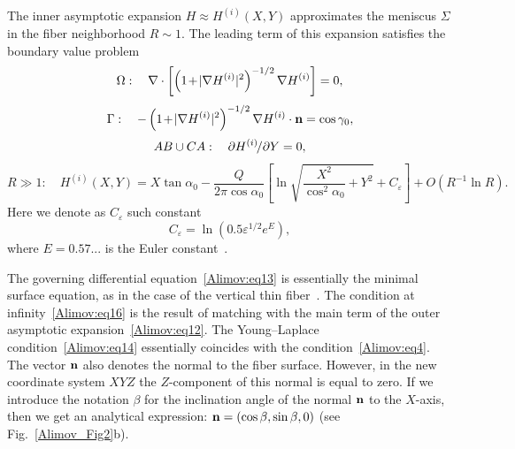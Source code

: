 \documentclass[
11pt,%
tightenlines,%
twoside,%
onecolumn,%
nofloats,%
nobibnotes,%
nofootinbib,%
superscriptaddress,%
noshowpacs,%
centertags]%
{revtex4-2}
\begin{document}
The inner asymptotic expansion $H \approx H^{(i)}(X,Y)$ approximates the meniscus $\Sigma $ in the
fiber neighborhood $R \sim 1$. The leading term of this expansion satisfies the boundary value
problem~\cite{Alimov:bib9}
\begin{equation}
\label{Alimov:eq13} \Omega :\quad \nabla \cdot \left[ {\left(
1\hspace{-0.5mm}+\hspace{-0.5mm}\vert\nabla H^{(i)}\vert^{2} \right)^{- 1/2}\nabla H^{(i)}} \right]
= 0,
\end{equation}
\begin{equation}
\label{Alimov:eq14} \Gamma :\quad -\left( 1\hspace{-0.5mm}+\hspace{-0.5mm}\vert\nabla
H^{(i)}\vert^{2} \right)^{-1/2}\nabla H^{(i)} \cdot {\rm {\bf n}} = \cos \gamma_0,
\end{equation}
\begin{equation}
\label{Alimov:eq15} AB \cup CA:\quad {\partial H^{(i)}}\hspace{-0.5mm}/{\partial Y} = 0,
\end{equation}
\begin{equation}
\label{Alimov:eq16} R \gg 1:\quad  H^{(i)}(X,Y) = X \tan \alpha_0 - \frac{Q}{2\pi \cos \alpha_0}
\left[ {\ln \sqrt {\frac{X^2}{\cos^2\alpha_0 } + Y^2}+C_\varepsilon } \right] + O\left( {R^{-1}\ln
R} \right).
\end{equation}
Here we denote as $C_\varepsilon$ such constant
\begin{equation}
\label{Alimov:eq17} C_\varepsilon = \ln \left( {0.5 \varepsilon^{1/2} e^E} \right),
\end{equation}
where $E = 0.57...$ is the Euler constant~\cite{Alimov:bib14}.

The governing differential equation~\eqref{Alimov:eq13} is essentially the minimal surface
equation, as in the case of the vertical thin fiber~\cite{Alimov:bib5}. The condition at
infinity~\eqref{Alimov:eq16} is the result of matching with the main term of the outer asymptotic
expansion~\eqref{Alimov:eq12}. The Young--Laplace condition~\eqref{Alimov:eq14} essentially
coincides with the condition~\eqref{Alimov:eq4}. The vector ${\rm {\bf n}}$ also denotes the normal
to the fiber surface. However, in the new coordinate system $XYZ$ the $Z$-component of this normal
is equal to zero. If we introduce the notation $\beta$ for the inclination angle of the normal
${\rm {\bf n}}$ to the $X$-axis, then we get an analytical expression: ${\rm {\bf n}} = (\cos
\beta, \sin \beta, 0)$ (see Fig.~\ref{Alimov_Fig2}b).
\end{document}
